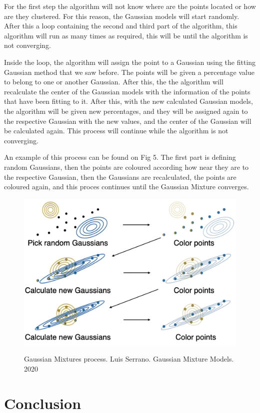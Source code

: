 \documentclass[conference]{IEEEtran}
\begin{document}
For the first step the algorithm will not know where are the points located or how are they clustered. For this reason, the Gaussian models will start randomly. After this a loop containing the second and third part of the algorithm, this algorithm will run as many times as required, this will be until the algorithm is not converging.

Inside the loop, the algorithm will assign the point to a Gaussian using the fitting Gaussian method that we saw before. The points will be given a percentage value to belong to one or another Gaussian. After this, the the algorithm will recalculate the center of the Gaussian models with the information of the points that have been fitting to it. After this, with the new calculated Gaussian models, the algorithm will be given new percentages, and they will be assigned again to the respective Gaussian with the new values, and the center of the Gaussian will be calculated again. This process will continue while the algorithm is not converging.

An example of this process can be found on Fig 5. The first part is defining random Gaussians, then the points are coloured according how near they are to the respective Gaussian, then the Gaussians are recalculated, the points are coloured again, and this proces continues until the Gaussian Mixture converges.

\begin{figure}[h]
	\includegraphics[scale=0.22]{imgs/gaussian3.png}
	\label{fig:gaussian}
	\caption{Gaussian Mixtures process. Luis Serrano. Gaussian Mixture Models. 2020}
\end{figure}

\section{Conclusion} 
\end{document}
